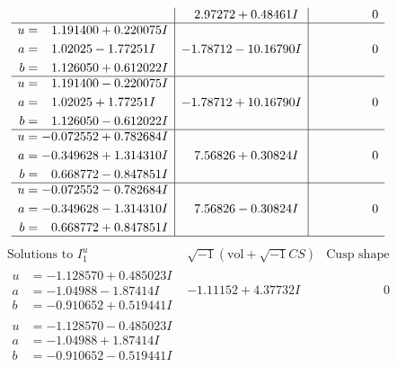 \documentclass[1p]{elsarticle_modified}
\theoremstyle{definition}
\newcommand{\I}{\sqrt{-1}}
\begin{document}
$$\begin{array}{c|c|c}
 & \phantom{-}2.97272 + 0.48461 I & \phantom{-0.000000 } 0 \\ \hline\begin{aligned}
u &= \phantom{-}1.191400 + 0.220075 I \\
a &= \phantom{-}1.02025 - 1.77251 I \\
b &= \phantom{-}1.126050 + 0.612022 I\end{aligned}
 & -1.78712 - 10.16790 I & \phantom{-0.000000 } 0 \\ \hline\begin{aligned}
u &= \phantom{-}1.191400 - 0.220075 I \\
a &= \phantom{-}1.02025 + 1.77251 I \\
b &= \phantom{-}1.126050 - 0.612022 I\end{aligned}
 & -1.78712 + 10.16790 I & \phantom{-0.000000 } 0 \\ \hline\begin{aligned}
u &= -0.072552 + 0.782684 I \\
a &= -0.349628 + 1.314310 I \\
b &= \phantom{-}0.668772 - 0.847851 I\end{aligned}
 & \phantom{-}7.56826 + 0.30824 I & \phantom{-0.000000 } 0 \\ \hline\begin{aligned}
u &= -0.072552 - 0.782684 I \\
a &= -0.349628 - 1.314310 I \\
b &= \phantom{-}0.668772 + 0.847851 I\end{aligned}
 & \phantom{-}7.56826 - 0.30824 I & \phantom{-0.000000 } 0\\
 \hline 
 \end{array}$$\newpage$$\begin{array}{c|c|c}  
\text{Solutions to }I^u_{1}& \I (\text{vol} + \sqrt{-1}CS) & \text{Cusp shape}\\
 \hline 
\begin{aligned}
u &= -1.128570 + 0.485023 I \\
a &= -1.04988 - 1.87414 I \\
b &= -0.910652 + 0.519441 I\end{aligned}
 & -1.11152 + 4.37732 I & \phantom{-0.000000 } 0 \\ \hline\begin{aligned}
u &= -1.128570 - 0.485023 I \\
a &= -1.04988 + 1.87414 I \\
b &= -0.910652 - 0.519441 I\end{aligned}

\end{array}$$
\end{document}
